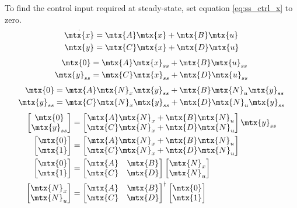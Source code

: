 To find the \gls{control input} required at steady-state, set equation
\eqref{eq:ss_ctrl_x} to zero.
\begin{align*}
  \dot{\mtx{x}} &= \mtx{A}\mtx{x} + \mtx{B}\mtx{u} \\
  \mtx{y} &= \mtx{C}\mtx{x} + \mtx{D}\mtx{u}
\end{align*}
\begin{align*}
  \mtx{0} &= \mtx{A}\mtx{x}_{ss} + \mtx{B}\mtx{u}_{ss} \\
  \mtx{y}_{ss} &= \mtx{C}\mtx{x}_{ss} + \mtx{D}\mtx{u}_{ss}
\end{align*}
\begin{align*}
  \mtx{0} &= \mtx{A}\mtx{N}_x\mtx{y}_{ss} + \mtx{B}\mtx{N}_u\mtx{y}_{ss} \\
  \mtx{y}_{ss} &= \mtx{C}\mtx{N}_x\mtx{y}_{ss} + \mtx{D}\mtx{N}_u\mtx{y}_{ss}
\end{align*}
\begin{align*}
  \begin{bmatrix}
    \mtx{0} \\
    \mtx{y}_{ss}
  \end{bmatrix} &=
  \begin{bmatrix}
    \mtx{A}\mtx{N}_x + \mtx{B}\mtx{N}_u \\
    \mtx{C}\mtx{N}_x + \mtx{D}\mtx{N}_u
  \end{bmatrix}
  \mtx{y}_{ss} \\
  \begin{bmatrix}
    \mtx{0} \\
    \mtx{1}
  \end{bmatrix} &=
  \begin{bmatrix}
    \mtx{A}\mtx{N}_x + \mtx{B}\mtx{N}_u \\
    \mtx{C}\mtx{N}_x + \mtx{D}\mtx{N}_u
  \end{bmatrix} \\
  \begin{bmatrix}
    \mtx{0} \\
    \mtx{1}
  \end{bmatrix} &=
  \begin{bmatrix}
    \mtx{A} & \mtx{B} \\
    \mtx{C} & \mtx{D}
  \end{bmatrix}
  \begin{bmatrix}
    \mtx{N}_x \\
    \mtx{N}_u
  \end{bmatrix} \\
  \begin{bmatrix}
    \mtx{N}_x \\
    \mtx{N}_u
  \end{bmatrix} &=
  \begin{bmatrix}
    \mtx{A} & \mtx{B} \\
    \mtx{C} & \mtx{D}
  \end{bmatrix}^{\dagger}
  \begin{bmatrix}
    \mtx{0} \\
    \mtx{1}
  \end{bmatrix}
\end{align*}

